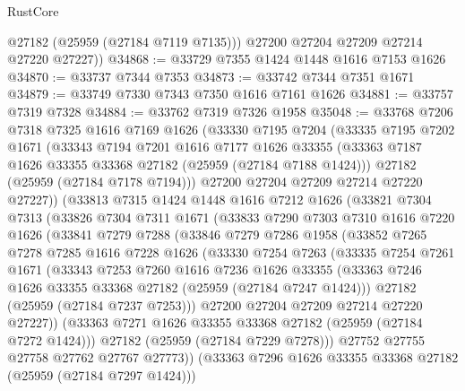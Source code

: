 \begin{lexlean}{RustCore}
\begin{coremodule}
          @27182
          (@25959 (@27184 @7119 @7135)))
        @27200
        @27204
        @27209
        @27214
        @27220
        @27227))
@34868 := @33729 @7355 @1424 @1448 @1616 @7153 @1626
@34870 := @33737 @7344 @7353
@34873 := @33742 @7344 @7351 @1671
@34879 := @33749 @7330 @7343 @7350 @1616 @7161 @1626
@34881 := @33757 @7319 @7328
@34884 := @33762 @7319 @7326 @1958
@35048 := @33768
    @7206
    @7318
    @7325
    @1616
    @7169
    @1626
    (@33330
      @7195
      @7204
      (@33335
        @7195
        @7202
        @1671
        (@33343
          @7194
          @7201
          @1616
          @7177
          @1626
          @33355
          (@33363 @7187 @1626 @33355 @33368 @27182 (@25959 (@27184 @7188 @1424)))
          @27182
          (@25959 (@27184 @7178 @7194)))
        @27200
        @27204
        @27209
        @27214
        @27220
        @27227))
    (@33813
      @7315
      @1424
      @1448
      @1616
      @7212
      @1626
      (@33821
        @7304
        @7313
        (@33826
          @7304
          @7311
          @1671
          (@33833
            @7290
            @7303
            @7310
            @1616
            @7220
            @1626
            (@33841
              @7279
              @7288
              (@33846
                @7279
                @7286
                @1958
                (@33852
                  @7265
                  @7278
                  @7285
                  @1616
                  @7228
                  @1626
                  (@33330
                    @7254
                    @7263
                    (@33335
                      @7254
                      @7261
                      @1671
                      (@33343
                        @7253
                        @7260
                        @1616
                        @7236
                        @1626
                        @33355
                        (@33363 @7246 @1626 @33355 @33368 @27182 (@25959 (@27184 @7247 @1424)))
                        @27182
                        (@25959 (@27184 @7237 @7253)))
                      @27200
                      @27204
                      @27209
                      @27214
                      @27220
                      @27227))
                  (@33363 @7271 @1626 @33355 @33368 @27182 (@25959 (@27184 @7272 @1424)))
                  @27182
                  (@25959 (@27184 @7229 @7278)))
                @27752
                @27755
                @27758
                @27762
                @27767
                @27773))
            (@33363 @7296 @1626 @33355 @33368 @27182 (@25959 (@27184 @7297 @1424)))

\end{coremodule}
\end{lexlean}
